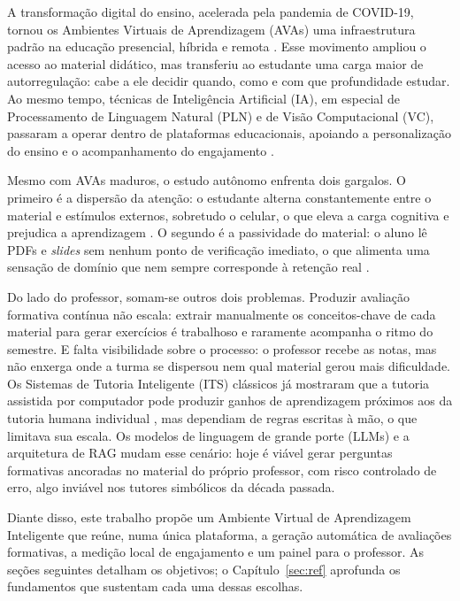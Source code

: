 \documentclass[portuguese,oneside]{tcc}
\begin{document}
A transformação digital do ensino, acelerada pela pandemia de COVID-19, tornou os Ambientes Virtuais de Aprendizagem (AVAs) uma infraestrutura padrão na educação presencial, híbrida e remota \cite{HBF19,Bat19}. Esse movimento ampliou o acesso ao material didático, mas transferiu ao estudante uma carga maior de autorregulação: cabe a ele decidir quando, como e com que profundidade estudar. Ao mesmo tempo, técnicas de Inteligência Artificial (IA), em especial de Processamento de Linguagem Natural (PLN) e de Visão Computacional (VC), passaram a operar dentro de plataformas educacionais, apoiando a personalização do ensino e o acompanhamento do engajamento \cite{Van11,HBF19}.

Mesmo com AVAs maduros, o estudo autônomo enfrenta dois gargalos. O primeiro é a dispersão da atenção: o estudante alterna constantemente entre o material e estímulos externos, sobretudo o celular, o que eleva a carga cognitiva e prejudica a aprendizagem \cite{KDB17,Bat19}. O segundo é a passividade do material: o aluno lê PDFs e \emph{slides} sem nenhum ponto de verificação imediato, o que alimenta uma sensação de domínio que nem sempre corresponde à retenção real \cite{DDD17}.

Do lado do professor, somam-se outros dois problemas. Produzir avaliação formativa contínua não escala: extrair manualmente os conceitos-chave de cada material para gerar exercícios é trabalhoso e raramente acompanha o ritmo do semestre. E falta visibilidade sobre o processo: o professor recebe as notas, mas não enxerga onde a turma se dispersou nem qual material gerou mais dificuldade. Os Sistemas de Tutoria Inteligente (ITS) clássicos já mostraram que a tutoria assistida por computador pode produzir ganhos de aprendizagem próximos aos da tutoria humana individual \cite{Van11}, mas dependiam de regras escritas à mão, o que limitava sua escala. Os modelos de linguagem de grande porte (LLMs) \cite{BMR20,ZZL23} e a arquitetura de RAG \cite{LPP20,GXG23} mudam esse cenário: hoje é viável gerar perguntas formativas ancoradas no material do próprio professor, com risco controlado de erro, algo inviável nos tutores simbólicos da década passada.

Diante disso, este trabalho propõe um Ambiente Virtual de Aprendizagem Inteligente que reúne, numa única plataforma, a geração automática de avaliações formativas, a medição local de engajamento e um painel para o professor. As seções seguintes detalham os objetivos; o Capítulo~\ref{sec:ref} aprofunda os fundamentos que sustentam cada uma dessas escolhas.
\end{document}
